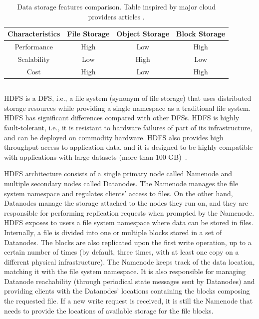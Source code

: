 \begin{table}[!ht]
    \begin{center}
      \caption[Data storage features comparison]{Data storage features comparison. Table inspired by major cloud providers articles \cite{BlockVsFile,HowObjectVs}.}
      \label{tab:storagecomparison}
      \begin{tabular}{cccc} %
        \toprule
        \textbf{Characteristics}\Tstrut\Bstrut & \textbf{File Storage} & \textbf{Object Storage} & \textbf{Block Storage}\\
        \midrule
        Performance & High & Low & High\Tstrut\\
        Scalability & Low & High & Low\\
        Cost & High & Low & High\Bstrut\\
        \bottomrule
      \end{tabular}
    \end{center}
\end{table}

\subsection{}

\gls{HDFS} is a \gls{DFS}, i.e., a file system (synonym of file storage) that uses distributed storage resources while providing a single namespace as a traditional file system. \gls{HDFS} has significant differences compared with other \glspl{DFS}. \gls{HDFS} is highly fault-tolerant, i.e., it is resistant to hardware failures of part of its infrastructure, and can be deployed on commodity hardware. \gls{HDFS} also provides high throughput access to application data, and it is designed to be highly compatible with applications with large datasets (more than 100 GB)~\cite{borthakurHadoopDistributedFile2005}. 

\gls{HDFS} architecture consists of a single primary node called Namenode and multiple secondary nodes called Datanodes. The Namenode manages the file system namespace and regulates clients' access to files. On the other hand, Datanodes manage the storage attached to the nodes they run on, and they are responsible for performing replication requests when prompted by the Namenode. \gls{HDFS} exposes to users a file system namespace where data can be stored in files. Internally, a file is divided into one or multiple blocks stored in a set of Datanodes. The blocks are also replicated upon the first write operation, up to a certain number of times (by default, three times, with at least one copy on a different physical infrastructure). The Namenode keeps track of the data location, matching it with the file system namespace. It is also responsible for managing Datanode reachability (through periodical state messages sent by Datanodes) and providing clients with the Datanodes' locations containing the blocks composing the requested file. If a new write request is received, it is still the Namenode that needs to provide the locations of available storage for the file blocks. 

